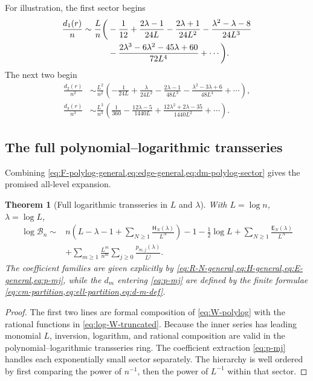 \documentclass[11pt,a4paper]{article}
\newtheorem{theorem}{Theorem}[section]
\theoremstyle{definition}
\theoremstyle{remark}
\newcommand{\Bell}{\mathcal B}
\newcommand{\cH}{\mathsf H}
\newcommand{\cE}{\mathsf E}
\begin{document}
For illustration, the first sector begins
\begin{align}\label{eq:first-exp-sector}
 \frac{d_1(r)}n
 \sim \frac{L}{n}\biggl(&
 -\frac1{12}
 +\frac{2\lambda-1}{24L}
 -\frac{2\lambda+1}{24L^2}
 -\frac{\lambda^2-\lambda-8}{24L^3}\\
 &-\frac{2\lambda^3-6\lambda^2-45\lambda+60}{72L^4}
 +\cdots\biggr).\notag
\end{align}
The next two begin
\begin{align}
 \frac{d_2(r)}{n^2}
 &\sim \frac{L^2}{n^2}\left(
 -\frac1{24L}+\frac{\lambda}{24L^2}
 -\frac{2\lambda-1}{48L^3}
 -\frac{\lambda^2-3\lambda+6}{48L^4}+\cdots\right),
 \label{eq:second-exp-sector}\\
 \frac{d_3(r)}{n^3}
 &\sim \frac{L^3}{n^3}\left(
 \frac1{360}-\frac{12\lambda-5}{1440L}
 +\frac{12\lambda^2+2\lambda-35}{1440L^2}+\cdots\right).
 \label{eq:third-exp-sector}
\end{align}

\subsection{The full polynomial--logarithmic transseries}

Combining \cref{eq:F-polylog-general,eq:edge-general,eq:dm-polylog-sector}
gives the promised all-level expansion.

\begin{theorem}[Full logarithmic transseries in \(L\) and \(\lambda\)]
\label{thm:full-polylog}
With \(L=\log n\), \(\lambda=\log L\),
\begin{equation}\label{eq:full-polylog-box}
\boxed{
\begin{aligned}
 \log\Bell_n\sim{}&
 n\left(
   L-\lambda-1+
   \sum_{N\ge1}\frac{\cH_N(\lambda)}{L^N}
 \right)
 -1-\frac12\log L
 +\sum_{N\ge1}\frac{\cE_N(\lambda)}{L^N}\\
 &+\sum_{m\ge1}\frac{L^m}{n^m}
   \sum_{j\ge0}\frac{p_{m,j}(\lambda)}{L^j}.
\end{aligned}}
\end{equation}
The coefficient families are given explicitly by
\cref{eq:R-N-general,eq:H-general,eq:E-general,eq:p-mj}, while the
\(d_m\) entering \cref{eq:p-mj} are defined by the finite formulae
\cref{eq:cm-partition,eq:ell-partition,eq:d-m-def}.
\end{theorem}

\begin{proof}
The first two lines are formal composition of \cref{eq:W-polylog} with the
rational functions in \cref{eq:log-W-truncated}.  Because the inner series has
leading monomial \(L\), inversion, logarithm, and rational composition are
valid in the polynomial--logarithmic transseries ring.  The coefficient
extraction \cref{eq:p-mj} handles each exponentially small sector separately.
The hierarchy is well ordered by first comparing the power of \(n^{-1}\), then
the power of \(L^{-1}\) within that sector.
\end{proof}
\end{document}
